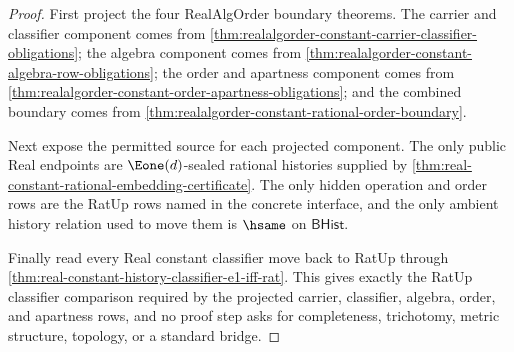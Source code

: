 \begin{proof}
First project the four RealAlgOrder boundary theorems. The carrier and
classifier component comes from
\autoref{thm:realalgorder-constant-carrier-classifier-obligations}; the
algebra component comes from
\autoref{thm:realalgorder-constant-algebra-row-obligations}; the order and
apartness component comes from
\autoref{thm:realalgorder-constant-order-apartness-obligations}; and the
combined boundary comes from
\autoref{thm:realalgorder-constant-rational-order-boundary}.

Next expose the permitted source for each projected component. The only public
Real endpoints are $\Eone(d)$-sealed rational histories supplied by
\autoref{thm:real-constant-rational-embedding-certificate}. The only hidden
operation and order rows are the RatUp rows named in the concrete interface,
and the only ambient history relation used to move them is $\hsame$ on
$\mathsf{BHist}$.

Finally read every Real constant classifier move back to RatUp through
\autoref{thm:real-constant-history-classifier-e1-iff-rat}. This gives exactly
the RatUp classifier comparison required by the projected carrier,
classifier, algebra, order, and apartness rows, and no proof step asks for
completeness, trichotomy, metric structure, topology, or a standard bridge.
\end{proof}

